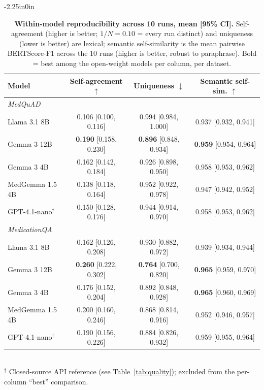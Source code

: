 \documentclass[10pt,letterpaper]{article}
\begin{document}
\begin{table}[!ht]
\begin{adjustwidth}{-2.25in}{0in}
\centering
\caption{{\bf Within-model reproducibility across 10 runs, mean [95\% CI].}
Self-agreement (higher is better; $1/N{=}0.10$ = every run distinct) and
uniqueness (lower is better) are lexical; semantic self-similarity is the mean
pairwise BERTScore-F1 across the 10 runs (higher is better, robust to
paraphrase). Bold = best among the open-weight models per column, per dataset.}
\label{tab:repro}
\footnotesize
\begin{tabular}{lccc}
\toprule
\textbf{Model} & \textbf{Self-agreement} $\uparrow$ & \textbf{Uniqueness} $\downarrow$ & \textbf{Semantic self-sim.} $\uparrow$ \\
\midrule
\multicolumn{4}{l}{\emph{MedQuAD}}\\
Llama 3.1 8B      & 0.106 [0.100, 0.116] & 0.994 [0.984, 1.000] & 0.937 [0.932, 0.941] \\
Gemma 3 12B       & \textbf{0.190} [0.158, 0.230] & \textbf{0.896} [0.848, 0.934] & \textbf{0.959} [0.954, 0.964] \\
Gemma 3 4B        & 0.162 [0.142, 0.184] & 0.926 [0.898, 0.950] & 0.958 [0.953, 0.962] \\
MedGemma 1.5 4B   & 0.138 [0.118, 0.164] & 0.952 [0.922, 0.978] & 0.947 [0.942, 0.952] \\
GPT-4.1-nano$^\dagger$ & 0.150 [0.128, 0.176] & 0.944 [0.914, 0.970] & 0.958 [0.953, 0.962] \\
\midrule
\multicolumn{4}{l}{\emph{MedicationQA}}\\
Llama 3.1 8B      & 0.162 [0.126, 0.208] & 0.930 [0.882, 0.972] & 0.939 [0.934, 0.944] \\
Gemma 3 12B       & \textbf{0.260} [0.222, 0.302] & \textbf{0.764} [0.700, 0.820] & \textbf{0.965} [0.959, 0.970] \\
Gemma 3 4B        & 0.176 [0.152, 0.204] & 0.892 [0.848, 0.928] & \textbf{0.965} [0.960, 0.969] \\
MedGemma 1.5 4B   & 0.200 [0.160, 0.246] & 0.868 [0.814, 0.916] & 0.952 [0.946, 0.957] \\
GPT-4.1-nano$^\dagger$ & 0.190 [0.156, 0.226] & 0.884 [0.826, 0.932] & 0.959 [0.955, 0.964] \\
\bottomrule
\end{tabular}
\\[2pt]
{\footnotesize $^\dagger$ Closed-source API reference (see
Table~\ref{tab:quality}); excluded from the per-column ``best'' comparison.}
\end{adjustwidth}
\end{table}
\end{document}
